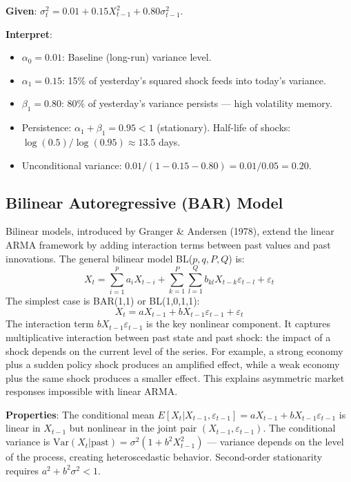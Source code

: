 \documentclass[11pt,a4paper]{article}
\begin{document}
\begin{tcolorbox}[colback=blue!5!white,colframe=blue!75!black,title=\textbf{Worked Example 18: GARCH(1,1) Parameter Interpretation}]
\textbf{Given}: $\sigma_t^2 = 0.01 + 0.15 X_{t-1}^2 + 0.80 \sigma_{t-1}^2$.

\textbf{Interpret}:
\begin{itemize}
    \item $\alpha_0 = 0.01$: Baseline (long-run) variance level.
    \item $\alpha_1 = 0.15$: 15\% of yesterday's squared shock feeds into today's variance.
    \item $\beta_1 = 0.80$: 80\% of yesterday's variance persists --- high volatility memory.
    \item Persistence: $\alpha_1 + \beta_1 = 0.95 < 1$ (stationary). Half-life of shocks: $\log(0.5)/\log(0.95) \approx 13.5$ days.
    \item Unconditional variance: $0.01 / (1 - 0.15 - 0.80) = 0.01 / 0.05 = 0.20$.
\end{itemize}
\end{tcolorbox}

\subsection{Bilinear Autoregressive (BAR) Model}

Bilinear models, introduced by Granger \& Andersen (1978), extend the linear ARMA framework by adding interaction terms between past values and past innovations. The general bilinear model BL($p, q, P, Q$) is:
\[
X_t = \sum_{i=1}^p a_i X_{t-i} + \sum_{k=1}^P \sum_{l=1}^Q b_{kl} X_{t-k} \varepsilon_{t-l} + \varepsilon_t
\]
The simplest case is BAR(1,1) or BL(1,0,1,1):
\[
X_t = a X_{t-1} + b X_{t-1} \varepsilon_{t-1} + \varepsilon_t
\]
The interaction term $b X_{t-1} \varepsilon_{t-1}$ is the key nonlinear component. It captures multiplicative interaction between past state and past shock: the impact of a shock depends on the current level of the series. For example, a strong economy plus a sudden policy shock produces an amplified effect, while a weak economy plus the same shock produces a smaller effect. This explains asymmetric market responses impossible with linear ARMA.

\textbf{Properties}: The conditional mean $E[X_t | X_{t-1}, \varepsilon_{t-1}] = a X_{t-1} + b X_{t-1} \varepsilon_{t-1}$ is linear in $X_{t-1}$ but nonlinear in the joint pair $(X_{t-1}, \varepsilon_{t-1})$. The conditional variance is $\text{Var}(X_t | \text{past}) = \sigma^2(1 + b^2 X_{t-1}^2)$ --- variance depends on the level of the process, creating heteroscedastic behavior. Second-order stationarity requires $a^2 + b^2 \sigma^2 < 1$.
\end{document}
